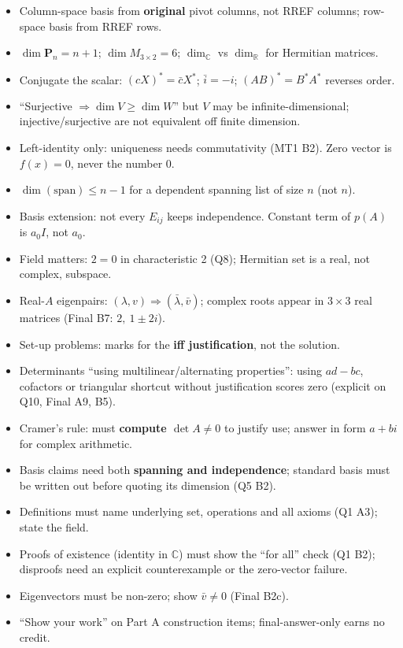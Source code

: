 \begin{itemize}[leftmargin=1.2em,itemsep=0pt,topsep=1pt]
\item Column-space basis from \textbf{original} pivot columns, not RREF columns; row-space basis from RREF rows.
\item $\dim\mathbf P_n=n+1$; $\dim M_{3\times2}=6$; $\dim_{\mathbb C}$ vs $\dim_{\mathbb R}$ for Hermitian matrices.
\item Conjugate the scalar: $(cX)^*=\bar cX^*$; $\bar i=-i$; $(AB)^*=B^*A^*$ reverses order.
\item ``Surjective $\Rightarrow\dim V\ge\dim W$'' but $V$ may be infinite-dimensional; injective/surjective are not equivalent off finite dimension.
\item Left-identity only: uniqueness needs commutativity (MT1 B2). Zero vector is $f(x)=0$, never the number $0$.
\item $\dim(\text{span})\le n-1$ for a dependent spanning list of size $n$ (not $n$).
\item Basis extension: not every $E_{ij}$ keeps independence. Constant term of $p(A)$ is $a_0I$, not $a_0$.
\item Field matters: $2=0$ in characteristic 2 (Q8); Hermitian set is a real, not complex, subspace.
\item Real-$A$ eigenpairs: $(\lambda,v)\Rightarrow(\bar\lambda,\bar v)$; complex roots appear in $3\times3$ real matrices (Final B7: $2,\ 1\pm2i$).
\end{itemize}
\begin{itemize}[leftmargin=1.2em,itemsep=0pt,topsep=1pt]
\item Set-up problems: marks for the \textbf{iff justification}, not the solution.
\item Determinants ``using multilinear/alternating properties'': using $ad-bc$, cofactors or triangular shortcut without justification scores zero (explicit on Q10, Final A9, B5).
\item Cramer's rule: must \textbf{compute $\det A\ne0$} to justify use; answer in form $a+bi$ for complex arithmetic.
\item Basis claims need both \textbf{spanning and independence}; standard basis must be written out before quoting its dimension (Q5 B2).
\item Definitions must name underlying set, operations and all axioms (Q1 A3); state the field.
\item Proofs of existence (identity in $\mathbb C$) must show the ``for all'' check (Q1 B2); disproofs need an explicit counterexample or the zero-vector failure.
\item Eigenvectors must be non-zero; show $\bar v\ne0$ (Final B2c).
\item ``Show your work'' on Part A construction items; final-answer-only earns no credit.
\end{itemize}
